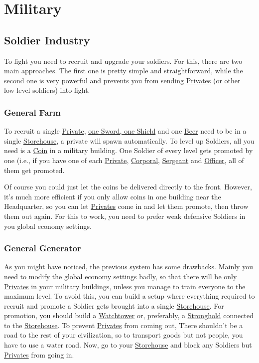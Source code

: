 \documentclass[12pt]{article}
\begin{document}
\section{Military}
\label{sec:military}

\subsection{Soldier Industry}

To fight you need to recruit and upgrade your soldiers. For this, there are two main approaches. The first one is pretty simple and straightforward, while the second one is very powerful and prevents you from sending \hyperref[sec:privates]{Privates} (or other low-level soldiers) into fight.

\subsubsection{General Farm}
\label{sec:generalfarm}

To recruit a single \hyperref[sec:private]{Private}, \hyperref[sec:smithy]{one Sword, one Shield} and one \hyperref[sec:brewery]{Beer} need to be in a single \hyperref[sec:storehouse]{Storehouse}, a private will spawn automatically. To level up Soldiers, all you need is a \hyperref[sec:mint]{Coin} in a military building. One Soldier of every level gets promoted by one (i.e., if you have one of each \hyperref[sec:private]{Private}, \hyperref[sec:corporal]{Corporal}, \hyperref[sec:sergeant]{Sergeant} and \hyperref[sec:officer]{Officer}, all of them get promoted.

Of course you could just let the coins be delivered directly to the front. However, it's much more efficient if you only allow coins in one building near the Headquarter, so you can let \hyperref[sec:private]{Privates} come in and let them promote, then throw them out again. For this to work, you need to prefer weak defensive Soldiers in you global economy settings.

\subsubsection{General Generator}
\label{sec:generalgenerator}

As you might have noticed, the previous system has some drawbacks. Mainly you need to modify the global economy settings badly, so that there will be only \hyperref[sec:private]{Privates} in your military buildings, unless you manage to train everyone to the maximum level. To avoid this, you can build a setup where everything required to recruit and promote a Soldier gets brought into a single \hyperref[sec:storehouse]{Storehouse}. For promotion, you should build a \hyperref[sec:watchtower]{Watchtower} or, preferably, a \hyperref[sec:stronghold]{Stronghold} connected to the \hyperref[sec:storehouse]{Storehouse}. To prevent \hyperref[sec:private]{Privates} from coming out, There shouldn't be a road to the rest of your civilization, so to transport goods but not people, you have to use a water road. Now, go to your \hyperref[sec:storehouse]{Storehouse} and block any Soldiers but \hyperref[sec:private]{Privates} from going in.
\end{document}
